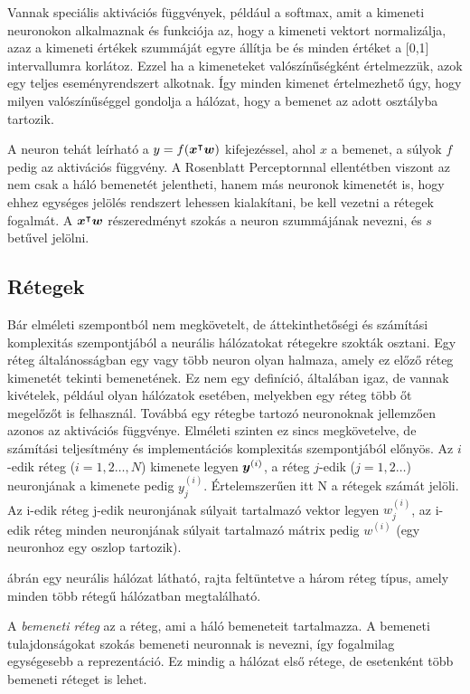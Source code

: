 Vannak speciális aktivációs függvények, például a softmax, amit a kimeneti neuronokon alkalmaznak és funkciója az, hogy a kimeneti vektort normalizálja, azaz a kimeneti értékek szummáját egyre állítja be és minden értéket a [0,1] intervallumra korlátoz. Ezzel ha a kimeneteket valószínűségként értelmezzük, azok egy teljes eseményrendszert alkotnak. Így minden kimenet értelmezhető úgy, hogy milyen valószínűséggel gondolja a hálózat, hogy a bemenet az adott osztályba tartozik.


A neuron tehát leírható a $y = f(\boldsymbol x^\intercal \boldsymbol w)$ kifejezéssel, ahol $x$ a bemenet, \w a súlyok $f$ pedig az aktivációs függvény. A Rosenblatt Perceptornnal ellentétben viszont az \x nem csak a háló bemenetét jelentheti, hanem más neuronok kimenetét is, hogy ehhez egységes jelölés rendszert lehessen kialakítani, be kell vezetni a rétegek fogalmát. A $\boldsymbol x^\intercal \boldsymbol w$ részeredményt szokás a neuron szummájának nevezni, és $s$ betűvel jelölni.
 
 
 
 \subsection{Rétegek}
 
Bár elméleti szempontból nem megkövetelt, de áttekinthetőségi és számítási komplexitás szempontjából a neurális hálózatokat rétegekre szokták osztani. Egy réteg általánosságban egy vagy több neuron olyan halmaza, amely ez előző réteg kimenetét tekinti bemenetének. Ez nem egy definíció, általában igaz, de vannak kivételek, például olyan hálózatok esetében, melyekben egy réteg több őt megelőzőt is felhasznál. Továbbá egy rétegbe tartozó neuronoknak jellemzően azonos az aktivációs függvénye. Elméleti szinten ez sincs megkövetelve, de számítási teljesítmény és implementációs komplexitás szempontjából előnyös.
Az $i$-edik réteg ($i = 1,2\dots, N$) kimenete legyen $\boldsymbol y^{(i)}$, a réteg $j$-edik ($j = 1,2\dots$)  neuronjának a kimenete pedig $y^{(i)}_j$. Értelemszerűen itt N a rétegek számát jelöli. Az i-edik réteg j-edik neuronjának súlyait tartalmazó vektor legyen $w^{(i)}_j$, az i-edik réteg minden neuronjának súlyait tartalmazó mátrix pedig $w^{(i)}$ (egy neuronhoz egy oszlop tartozik).   
 
 ábrán egy neurális hálózat látható, rajta feltüntetve a három réteg típus, amely minden több rétegű hálózatban megtalálható.
 
 A \emph{bemeneti réteg} az a réteg, ami a háló bemeneteit tartalmazza. A bemeneti tulajdonságokat szokás bemeneti neuronnak is nevezni, így fogalmilag egységesebb a reprezentáció. Ez mindig a hálózat első rétege, de esetenként több bemeneti réteget is lehet.
 
